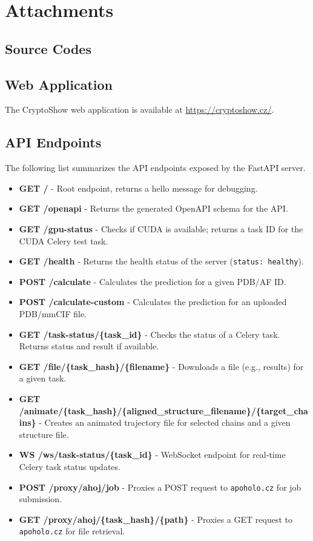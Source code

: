 \chapter{Attachments}

\section{Source Codes}
\label{sec:source-codes}


\section{Web Application}
\label{sec:web-application}

The CryptoShow web application is available at \url{https://cryptoshow.cz/}.

\section{API Endpoints}
\label{sec:api-endpoints}

The following list summarizes the API endpoints exposed by the FastAPI server.

\begin{itemize}
    \item \textbf{GET /} - Root endpoint, returns a hello message for debugging.
    \item \textbf{GET /openapi} - Returns the generated OpenAPI schema for the API.
    \item \textbf{GET /gpu-status} - Checks if CUDA is available; returns a task ID for the CUDA Celery test task.
    \item \textbf{GET /health} - Returns the health status of the server (\lstinline|status: healthy|).
    \item \textbf{POST /calculate} - Calculates the prediction for a given PDB/AF ID.
    \item \textbf{POST /calculate-custom} - Calculates the prediction for an uploaded PDB/mmCIF file.
    \item \textbf{GET /task-status/\{task\_id\}} - Checks the status of a Celery task. Returns status and result if available.
    \item \textbf{GET /file/\{task\_hash\}/\{filename\}} - Downloads a file (e.g., results) for a given task.
    \item \textbf{GET /animate/\{task\_hash\}/\{aligned\_structure\_filename\}/\{target\_chains\}} - Creates an animated trajectory file for selected chains and a given structure file.
    \item \textbf{WS /ws/task-status/\{task\_id\}} - WebSocket endpoint for real-time Celery task status updates.
    \item \textbf{POST /proxy/ahoj/job} - Proxies a POST request to \lstinline|apoholo.cz| for job submission.
    \item \textbf{GET /proxy/ahoj/\{task\_hash\}/\{path\}} - Proxies a GET request to \lstinline|apoholo.cz| for file retrieval.
\end{itemize}
